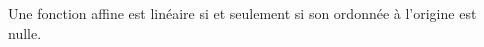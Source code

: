 Une fonction affine est linéaire si et seulement si son ordonnée à l'origine est nulle.

\begin{reponses}
\end{reponses}

\begin{comment}

\end{comment}

